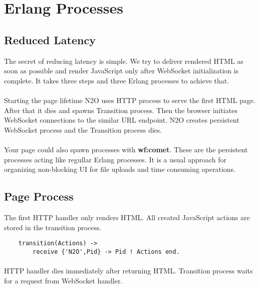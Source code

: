 \section{Erlang Processes}

\subsection{Reduced Latency}
The secret of reducing latency is simple. We try to deliver rendered HTML
as soon as possible and render JavaScript only after WebSocket initialization is complete.
It takes three steps and three Erlang processes to achieve that.


\paragraph{}
Starting the page lifetime N2O uses HTTP process to serve the first HTML page.
After that it dies and spawns Transition process.
Then the browser initiates WebSocket connections to the similar URL endpoint.
N2O creates persistent WebSocket process and the Transition process dies.

\paragraph{}
Your page could also spawn processes with {\bf wf:comet}.
These are the persistent processes acting like regullar Erlang processes.
It is a usual approach for organizing non-blocking UI for file uploads and time consuming operations.

\newpage
\subsection{Page Process}
The first HTTP handler only renders HTML. All created
JavaScript actions are stored in the transition process.

\vspace{1\baselineskip}
\begin{lstlisting}
    transition(Actions) ->
        receive {'N2O',Pid} -> Pid ! Actions end.
\end{lstlisting}

\paragraph{}
HTTP handler dies immediately after returning HTML. Transition process
waits for a request from WebSocket handler.

